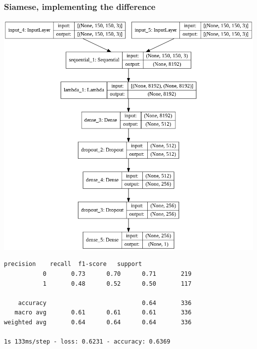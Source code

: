 \documentclass{article}
\begin{document}
\subsubsection{Siamese, implementing the difference}
\begin{minipage}{0.45\textwidth}
        \includegraphics[scale=0.32]{./img/siamese_diff.png}
\end{minipage}

\begin{verbatim}
precision    recall  f1-score   support
           0       0.73      0.70      0.71       219
           1       0.48      0.52      0.50       117

    accuracy                           0.64       336
   macro avg       0.61      0.61      0.61       336
weighted avg       0.64      0.64      0.64       336

1s 133ms/step - loss: 0.6231 - accuracy: 0.6369
\end{verbatim}
\end{document}
